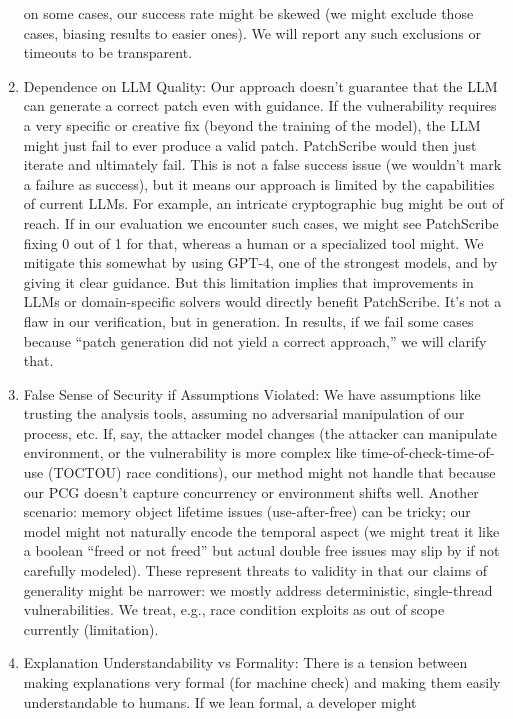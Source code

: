 \documentclass[conference,compsoc]{IEEEtran}
\begin{document}
\begin{enumerate}
  on some cases, our success rate might be skewed (we might exclude
  those cases, biasing results to easier ones). We will report any such
  exclusions or timeouts to be transparent.
\item
  Dependence on LLM Quality: Our approach doesn't guarantee that the LLM
  can generate a correct patch even with guidance. If the vulnerability
  requires a very specific or creative fix (beyond the training of the
  model), the LLM might just fail to ever produce a valid patch.
  PatchScribe would then just iterate and ultimately fail. This is not a
  false success issue (we wouldn't mark a failure as success), but it
  means our approach is limited by the capabilities of current LLMs. For
  example, an intricate cryptographic bug might be out of reach. If in
  our evaluation we encounter such cases, we might see PatchScribe
  fixing 0 out of 1 for that, whereas a human or a specialized tool
  might. We mitigate this somewhat by using GPT-4, one of the strongest
  models, and by giving it clear guidance. But this limitation implies
  that improvements in LLMs or domain-specific solvers would directly
  benefit PatchScribe. It's not a flaw in our verification, but in
  generation. In results, if we fail some cases because ``patch
  generation did not yield a correct approach,'' we will clarify that.
\item
  False Sense of Security if Assumptions Violated: We have assumptions
  like trusting the analysis tools, assuming no adversarial manipulation
  of our process, etc. If, say, the attacker model changes (the attacker
  can manipulate environment, or the vulnerability is more complex like
  time-of-check-time-of-use (TOCTOU) race conditions), our method might
  not handle that because our PCG doesn't capture concurrency or
  environment shifts well. Another scenario: memory object lifetime
  issues (use-after-free) can be tricky; our model might not naturally
  encode the temporal aspect (we might treat it like a boolean ``freed
  or not freed'' but actual double free issues may slip by if not
  carefully modeled). These represent threats to validity in that our
  claims of generality might be narrower: we mostly address
  deterministic, single-thread vulnerabilities. We treat, e.g., race
  condition exploits as out of scope currently (limitation).
\item
  Explanation Understandability vs Formality: There is a tension between
  making explanations very formal (for machine check) and making them
  easily understandable to humans. If we lean formal, a developer might

\end{enumerate}
\end{document}
